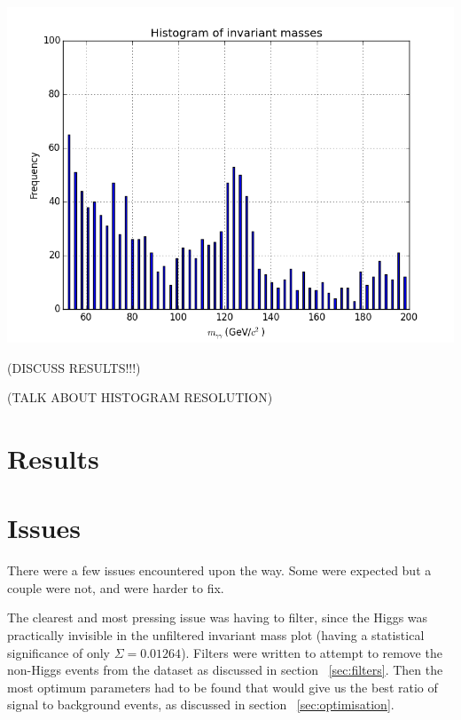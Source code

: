 \documentclass[11pt]{amsart}
\makeatletter
\newenvironment{figurehere}
  {\def\@captype{figure}}
  {}
\makeatother
\begin{document}
\begin{multicols}{2}
\begin{figurehere}
  \centering
  \includegraphics[width=\linewidth]{invmass2}
  \caption{Combined invariant mass plot in the mass range \SI{50}{\giga\electronvolt} to \SI{200}{\giga\electronvolt} with optimised filter parameters applied. In the mass range the Higgs had a significance of $\Sigma = 0.33295$}
  \label{fig:invmass}
\end{figurehere}

(DISCUSS RESULTS!!!)

(TALK ABOUT HISTOGRAM RESOLUTION)

\section{Results}

\section{Issues}

There were a few issues encountered upon the way. Some were expected but a couple were not, and were harder to fix.

The clearest and most pressing issue was having to filter, since the Higgs was practically invisible in the unfiltered invariant mass plot (having a statistical significance of only $\Sigma = 0.01264$). Filters were written to attempt to remove the non-Higgs events from the dataset as discussed in section ~\ref{sec:filters}. Then the most optimum parameters had to be found that would give us the best ratio of signal to background events, as discussed in section ~\ref{sec:optimisation}.


\end{multicols}
\end{document}
